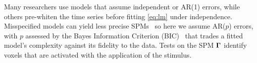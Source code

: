 Many researchers use models that assume independent or AR(1) errors,
while others pre-whiten the time series before fitting
\eqref{eq:lm} under independence. Misspecified models can yield less  
precise SPMs~\citep{monti11,luoandnichols03,lohetal08,lindquistetal09}
so here we assume AR($p$) errors, with $p$ assessed by the
Bayes Information 
Criterion (BIC)~\citep{schwarz78,shumwayandstoffer06} that trades  a
fitted model's  complexity against its fidelity to the data.  
Tests on the SPM $\boldsymbol{\Gamma}$ identify voxels that are activated with the
application of the stimulus. %
\begin{comment}
As mentioned in Section~\ref{sintro}, issues of multiple testing arise
in activation detection, and they are addressed by approaches~\citep{benjaminietal06,helleretal06,benjaminiandheller07,smithandfahrmeir07,smithandnichols09,
  wooetal14} that account little for spatial
resolution \citet{tabelowetal06}. 
\begin{comment}
~\citep{resnick2013,sibuya1960} computed the limiting distribution of a maximum random variable when this are i.i.d. Let $X_{(n)} = \max_{1\leq i \leq n} \{X_i\}$ that if there exist sequence $b_n \in \mathbb{R}$ and $a_n \in \mathbb{R}^+$, such that
\begin{equation}
  P\left(\frac{X_{(n)}-b_n}{a_n} \leq x\right) = P(X_{(n)} \leq a_n x + b_n) = [F_X(a_n  x + b_n)]^n,
\end{equation}
where $F^n_X$ is the cumulative distribution function of the random variable $X$ to the $n$-th power. In fact, if $X$ is normally distributed, then the limiting distribution of the maximum $X_{(n)}$ is a Gumbel random variable;
\begin{equation}
  \begin{split}
   [F_1(a_n x + b_n)]^n = G_{3,0}(x),\\
  \end{split}
\end{equation}
Let $X_1,\ldots X_n$ be independent identically distributed (IID) random
variables from the standard normal density truncated at 1.


\end{comment}
